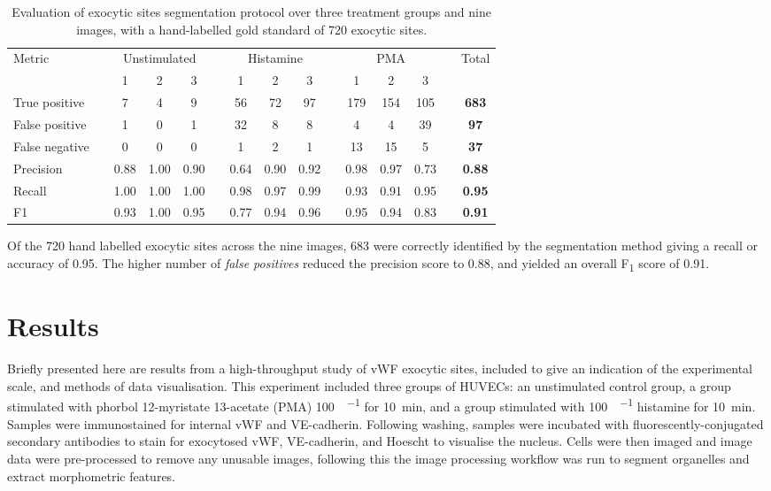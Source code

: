 \begin{table}[htbp!]
\footnotesize
\caption[Exocytic sites segmentation evaluation]{Evaluation of exocytic sites segmentation protocol over three treatment groups and nine images, with a hand-labelled gold standard of 720 exocytic sites.}
\centering
\label{table:endothelial_morphometry:exocytic_sites_performance}
\begin{tabular}{l c c c c c c c c c c c c c >{\bfseries}c}
\toprule
\multirow{2}{*}{Metric} & & \multicolumn{3}{c}{Unstimulated} & & \multicolumn{3}{c}{Histamine} & & \multicolumn{3}{c}{PMA} & & \multirow{2}{*}{Total} \\
\cmidrule{3-5}
\cmidrule{7-9}
\cmidrule{11-13}
	& & 1 & 2 & 3 & & 1 & 2 & 3 & & 1 & 2 & 3 & &\\
\midrule
	True positive  & & 7 & 4 & 9 & & 56 & 72 & 97 & & 179 & 154 & 105 & & 683 \\
	False positive & & 1 & 0 & 1 & & 32 & 8  & 8  & & 4   & 4   & 39  & & 97  \\
	False negative & & 0 & 0 & 0 & & 1  & 2  & 1  & & 13  & 15  & 5   & & 37  \\
\midrule
	Precision      & & 0.88 & 1.00 & 0.90 & & 0.64 & 0.90 & 0.92 & & 0.98 & 0.97 & 0.73 & & 0.88 \\
	Recall         & & 1.00 & 1.00 & 1.00 & & 0.98 & 0.97 & 0.99 & & 0.93 & 0.91 & 0.95 & & 0.95 \\
	F1             & & 0.93 & 1.00 & 0.95 & & 0.77 & 0.94 & 0.96 & & 0.95 & 0.94 & 0.83 & & 0.91 \\
\bottomrule
\end{tabular}
\end{table}

Of the 720 hand labelled exocytic sites across the nine images, 683 were correctly identified by the segmentation method giving a recall or accuracy of 0.95. The higher number of \emph{false positives} reduced the precision score to 0.88, and yielded an overall F\textsubscript{1} score of 0.91.

\section{Results}
\label{endothelial_morphometry:results}
Briefly presented here are results from a high-throughput study of vWF exocytic sites, included to give an indication of the experimental scale, and methods of data visualisation. This experiment included three groups of HUVECs: an unstimulated control group, a group stimulated with phorbol 12-myristate 13-acetate (PMA) \SI{100}{\nanogram\per\millilitre} for \SI{10}{\minute}, and a group stimulated with \SI{100}{\nanogram\per\millilitre} histamine for \SI{10}{\minute}. Samples were immunostained for internal vWF and VE-cadherin. Following washing, samples were incubated with fluorescently-conjugated secondary antibodies to stain for exocytosed vWF, VE-cadherin, and Hoescht to visualise the nucleus. Cells were then imaged and image data were pre-processed to remove any unusable images, following this the image processing workflow was run to segment organelles and  extract morphometric features.

